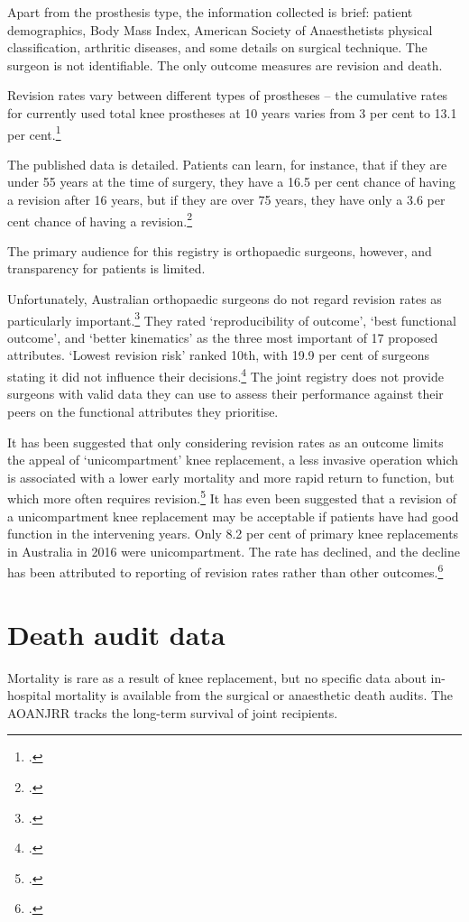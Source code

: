 \documentclass[FrontPage]{grattan}
\begin{document}
Apart from the prosthesis type, the information collected is brief: patient demographics, Body Mass Index, American Society of Anaesthetists physical classification, arthritic diseases, and some details on surgical technique. The surgeon is not identifiable. The only outcome measures are revision and death.

Revision rates vary between different types of prostheses -- the cumulative rates for currently used total knee prostheses at 10 years varies from 3 per cent to 13.1 per cent.\footcite[][12]{AOANJRR2017lay}

The published data is detailed. Patients can learn, for instance, that if they are under 55 years at the time of surgery, they have a 16.5 per cent chance of having a revision after 16 years, but if they are over 75 years, they have only a 3.6 per cent chance of having a revision.\footcite[][19]{AOANJRR2017lay}

The primary audience for this registry is orthopaedic surgeons, however, and transparency for patients is limited.

Unfortunately, Australian orthopaedic surgeons do not regard revision rates as particularly important.\footcite{RN98}
They rated ‘reproducibility of outcome’, ‘best functional outcome’, and ‘better kinematics’ as the three most important of 17 proposed attributes. ‘Lowest revision risk’ ranked 10th, with 19.9 per cent of surgeons stating it did not influence their decisions.\footcite{RN98}
The joint registry does not provide surgeons with valid data they can use to assess their performance against their peers on the functional attributes they prioritise. 

It has been suggested that only considering revision rates as an outcome limits the appeal of ‘unicompartment’ knee replacement, a less invasive operation which is associated with a lower early mortality and more rapid return to function, but which more often requires revision.\footcites{RN100}{RN99}
It has even been suggested that a revision of a unicompartment knee replacement may be acceptable if patients have had good function in the intervening years.  Only 8.2 per cent of primary knee replacements in Australia in 2016 were unicompartment. The rate has declined, and the decline has been attributed to reporting of revision rates rather than other outcomes.\footcite{RN100}

\section{Death audit data}\label{sec:kneedeath}
Mortality is rare as a result of knee replacement, but no specific data about in-hospital mortality is available from the surgical or anaesthetic death audits. The AOANJRR tracks the long-term survival of joint recipients.
\end{document}
